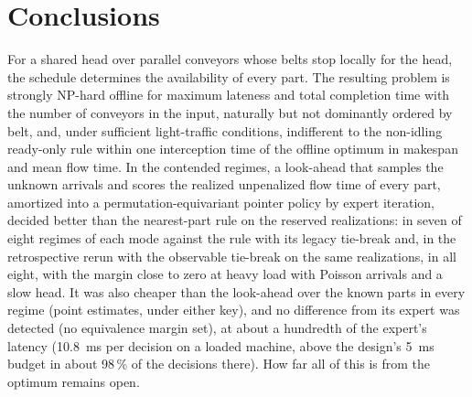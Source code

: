 \documentclass[11pt,a4paper]{article}
\theoremstyle{plain}
\theoremstyle{definition}
\theoremstyle{remark}
\begin{document}
\section{Conclusions}
For a shared head over parallel conveyors whose belts stop locally for the head, the
schedule determines the availability of every part. The resulting problem is strongly
NP-hard offline for maximum lateness and total completion time with the number of
conveyors in the input, naturally but not dominantly ordered by belt, and, under sufficient
light-traffic conditions, indifferent to the non-idling ready-only rule within one
interception time of the offline optimum in makespan and mean flow time. In the contended regimes, a look-ahead that
samples the unknown arrivals and scores the realized unpenalized flow time of every part,
amortized into a
permutation-equivariant pointer policy by expert iteration, decided better than the
nearest-part rule on the reserved realizations: in seven of eight regimes of each mode
against the rule with its legacy tie-break and, in the retrospective rerun with the
observable tie-break on the same realizations, in all eight, with the margin close to zero
at heavy load with Poisson arrivals and a slow head. It was also cheaper than the look-ahead
over the known parts in every regime (point estimates, under either key), and no difference
from its expert was detected (no equivalence margin set), at about a hundredth of the
expert's latency (10.8~ms per decision on a loaded machine, above the design's 5~ms budget
in about 98\,\% of the decisions there). How far all of this
is from the optimum remains open.



\end{document}
